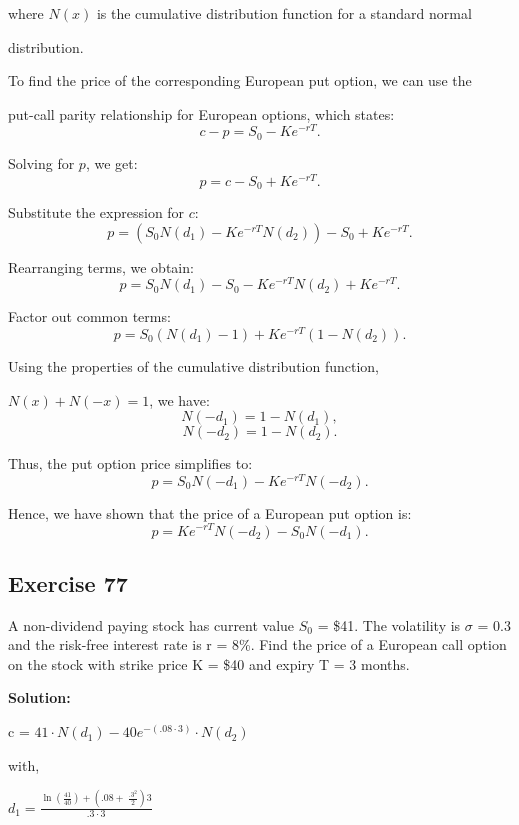 \documentclass{article}
\begin{document}
where \( N(x) \) is the cumulative distribution function for a standard normal 

distribution.

\vspace{\baselineskip}

To find the price of the corresponding European put option, we can use the 

put-call parity relationship for European options, which states:
\[
c - p = S_0 - Ke^{-rT}.
\]

Solving for \( p \), we get:
\[
p = c - S_0 + Ke^{-rT}.
\]

Substitute the expression for \( c \):
\[
p = \left( S_0 N(d_1) - Ke^{-rT} N(d_2) \right) - S_0 + Ke^{-rT}.
\]

Rearranging terms, we obtain:
\[
p = S_0 N(d_1) - S_0 - Ke^{-rT} N(d_2) + Ke^{-rT}.
\]

Factor out common terms:
\[
p = S_0 (N(d_1) - 1) + Ke^{-rT} (1 - N(d_2)).
\]

Using the properties of the cumulative distribution function,

\( N(x) + N(-x) = 1 \), we have:
\[
N(-d_1) = 1 - N(d_1),
\]
\[
N(-d_2) = 1 - N(d_2).
\]

Thus, the put option price simplifies to:
\[
p = S_0 N(-d_1) - Ke^{-rT} N(-d_2).
\]

Hence, we have shown that the price of a European put option is:
\[
p = Ke^{-rT} N(-d_2) - S_0 N(-d_1).
\]

\subsection*{Exercise 77}

A non-dividend paying stock has current value $S_0$ = \$41. The volatility is $\sigma$ = 0.3 and the risk-free
interest rate is r = 8\%. Find the price of a European call option on the stock with strike price K = \$40 and
expiry T = 3 months.

\textbf{Solution:}

c = $41\cdot N\left(d_{1}\right)-40e^{-\left(.08\cdot3\right)}\cdot N\left(d_{2}\right)$

\vspace{\baselineskip}

with,

\vspace{\baselineskip}

$d_{1}=\frac{\ln\left(\frac{41}{40}\right)+\left(.08+\ \frac{.3^{2}}{2}\right)3}{.3\cdot3}$
\end{document}
